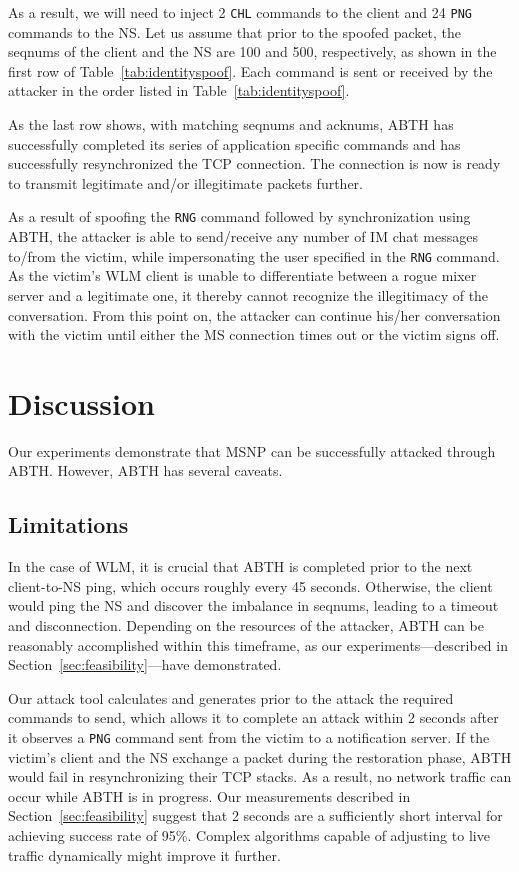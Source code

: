 \documentclass{sig-alternate}
\begin{document}
As a result, we will need to inject 2 \texttt{CHL} commands to the client and 24 \texttt{PNG} commands to the NS.
Let us assume that prior to the spoofed packet, the seqnums of the client and the NS are 100 and 500, respectively, as shown in the first row of Table~\ref{tab:identityspoof}.
Each command is sent or received by the attacker in the order listed in Table~\ref{tab:identityspoof}.

As the last row shows, with matching seqnums and acknums, ABTH has successfully completed its series of application specific commands and has successfully resynchronized the TCP connection.
The connection is now is ready to transmit legitimate and/or illegitimate packets further.

As a result of spoofing the \texttt{RNG} command followed by synchronization using ABTH, the attacker is able to send/receive any number of IM chat messages to/from the victim, while impersonating the user specified in the \texttt{RNG} command.
As the victim's WLM client is unable to differentiate between a rogue mixer server and a legitimate one, it thereby cannot recognize the illegitimacy of the conversation.
From this point on, the attacker can continue his/her conversation with the victim until either the MS connection times out or the victim signs off.

\section{Discussion}
\label{sec:discussion}

Our experiments demonstrate that MSNP can be successfully attacked through ABTH.
However, ABTH has several caveats.

\subsection{Limitations}

In the case of WLM, it is crucial that ABTH is completed prior to the next client-to-NS ping, which occurs roughly every 45 seconds.
Otherwise, the client would ping the NS and discover the imbalance in seqnums, leading to a timeout and disconnection.
Depending on the resources of the attacker, ABTH can be reasonably accomplished within this timeframe, as our experiments---described in Section~\ref{sec:feasibility}---have demonstrated.

Our attack tool calculates and generates prior to the attack the required commands to send, which allows it to complete an attack within 2 seconds after it observes a \texttt{PNG} command sent from the victim to a notification server.
If the victim's client and the NS exchange a packet during the restoration phase, ABTH would fail in resynchronizing their TCP stacks.
As a result, no network traffic can occur while ABTH is in progress. 
Our measurements described in Section~\ref{sec:feasibility} suggest that 2 seconds are a sufficiently short interval for achieving success rate of 95\%.
Complex algorithms capable of adjusting to live traffic dynamically might improve it further. 
\end{document}
